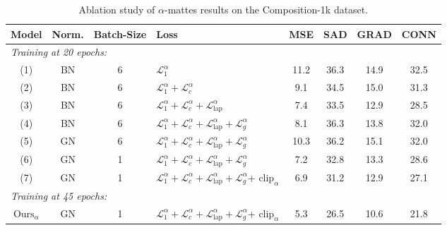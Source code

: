 \documentclass[runningheads]{llncs}
\begin{document}
\begin{table}[t]
\centering
\caption{Ablation study of $\alpha$-mattes results on the Composition-1k dataset.} 
\label{tab:comp1k_alpha_ablation}
\begin{tabular}{ccclcccc}
  \toprule
Model & Norm. & Batch-Size & Loss          & MSE & SAD & GRAD & CONN \\ 
\midrule
    \multicolumn{8}{l}{\textit{Training at 20 epochs:} \vspace{.3em}} \\
  (1) & BN            & 6         & $\mathcal{L}_1^\alpha$            &  11.2   & 36.3     & 14.9    & 32.5 \\
(2) & BN            & 6         & $\mathcal{L}_1^\alpha + \mathcal{L}_c^{\alpha}$        & 9.1    &    34.5 &   15.0    & 31.3 \\
(3) & BN            & 6         & $\mathcal{L}_1^\alpha + \mathcal{L}_c^{\alpha} + \mathcal{L}^{\alpha}_{\mathrm{lap}}$     & 7.4    & 33.5    & 12.9 & 28.5    \\
(4) & BN            & 6         & $\mathcal{L}_1^\alpha + \mathcal{L}_c^{\alpha} +
                                  \mathcal{L}^{\alpha}_{\mathrm{lap}} + \mathcal{L}^{\alpha}_{g}$ & 8.1    & 36.3     &    13.8  & 32.0 \\
(5) & GN            & 6         & $\mathcal{L}_1^\alpha + \mathcal{L}_c^{\alpha} +
                                  \mathcal{L}^{\alpha}_{\mathrm{lap}} + \mathcal{L}^{\alpha}_{g}$ & 10.3    & 36.2 & 15.1     &  32.0 \\

(6) & GN            & 1         & $\mathcal{L}_1^\alpha + \mathcal{L}_c^{\alpha} +
                                  \mathcal{L}^{\alpha}_{\mathrm{lap}} + \mathcal{L}^{\alpha}_{g}$ & 7.2    & 32.8 &    13.3  & 28.6 \\
(7) & GN            & 1         & $\mathcal{L}_1^\alpha + \mathcal{L}_c^{\alpha} +
                                  \mathcal{L}^{\alpha}_{\mathrm{lap}} + \mathcal{L}^{\alpha}_{g}$+ $\text{clip}_\alpha$ & 6.9      &  31.2   & 12.9 & 27.1 \\
\midrule
    \multicolumn{8}{l}{\textit{Training at 45 epochs:} \vspace{.3em}} \\
  \textbf{$\text{Ours}_\alpha$} &GN            & 1         & $\mathcal{L}_1^\alpha + \mathcal{L}_c^{\alpha} +
                                  \mathcal{L}^{\alpha}_{\mathrm{lap}} + \mathcal{L}^{\alpha}_{g}$+ $\text{clip}_\alpha$ & 5.3      &  26.5   & 10.6 & 21.8 \\
\bottomrule
\end{tabular}
\end{table}
\end{document}
